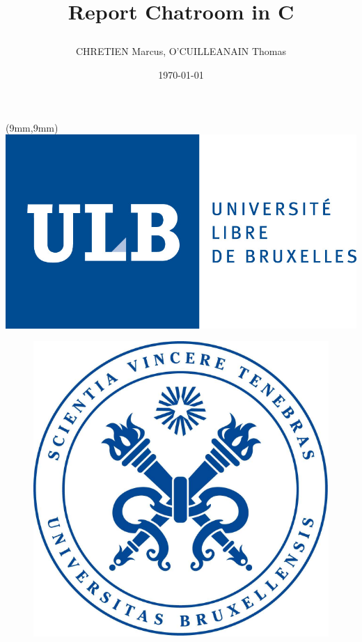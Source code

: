 \documentclass[utf8]{article}
\begin{document}
\begin{titlepage}
\begin{textblock*}{5cm}(9mm,9mm)
\includegraphics[scale=0.5]{ULB.jpg}
\end{textblock*}

\author{CHRETIEN Marcus, O'CUILLEANAIN Thomas}
\date{\today}
\title{
    \begin{minipage}\linewidth
        \centering
        Report
        \vskip10pt
        \large\textbf{Chatroom in C}
    \end{minipage}
}
\maketitle
\centering
\begin{figure}[H]
  \centering
	\includegraphics[scale=0.4]{SVT.png}
  \label{fig:logo}
\end{figure}
\end{titlepage}


\tableofcontents
\newpage
\end{document}
